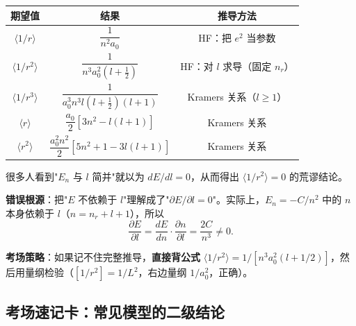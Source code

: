 \begin{formulabox}[氢原子期望值完整表]
\begin{center}
\renewcommand{\arraystretch}{1.6}
\begin{tabular}{|c|c|c|}
\hline
\textbf{期望值} & \textbf{结果} & \textbf{推导方法} \\
\hline
$\langle 1/r\rangle$ & $\dfrac{1}{n^2 a_0}$ & HF：把 $e^2$ 当参数 \\
\hline
$\langle 1/r^2\rangle$ & $\dfrac{1}{n^3 a_0^2(l+\frac{1}{2})}$ & HF：对 $l$ 求导（固定 $n_r$） \\
\hline
$\langle 1/r^3\rangle$ & $\dfrac{1}{a_0^3 n^3 l(l+\frac{1}{2})(l+1)}$ & Kramers 关系（$l\geq 1$） \\
\hline
$\langle r\rangle$ & $\dfrac{a_0}{2}[3n^2-l(l+1)]$ & Kramers 关系 \\
\hline
$\langle r^2\rangle$ & $\dfrac{a_0^2 n^2}{2}[5n^2+1-3l(l+1)]$ & Kramers 关系 \\
\hline
\end{tabular}
\end{center}
\end{formulabox}

\begin{warnbox}
很多人看到"$E_n$ 与 $l$ 简并"就以为 $dE/dl=0$，从而得出 $\langle 1/r^2\rangle = 0$ 的荒谬结论。

\textbf{错误根源}：把"$E$ 不依赖于 $l$"理解成了"$\partial E/\partial l = 0$"。实际上，$E_n = -C/n^2$ 中的 $n$ 本身依赖于 $l$（$n = n_r + l + 1$），所以
\[
\frac{\partial E}{\partial l} = \frac{dE}{dn}\cdot\frac{\partial n}{\partial l} = \frac{2C}{n^3} \neq 0.
\]

\textbf{考场策略}：如果记不住完整推导，\textbf{直接背公式} $\langle 1/r^2\rangle = 1/[n^3 a_0^2(l+1/2)]$，然后用量纲检验（$[1/r^2] = 1/L^2$，右边量纲 $1/a_0^2$，正确）。
\end{warnbox}

\subsection{考场速记卡：常见模型的二级结论}

